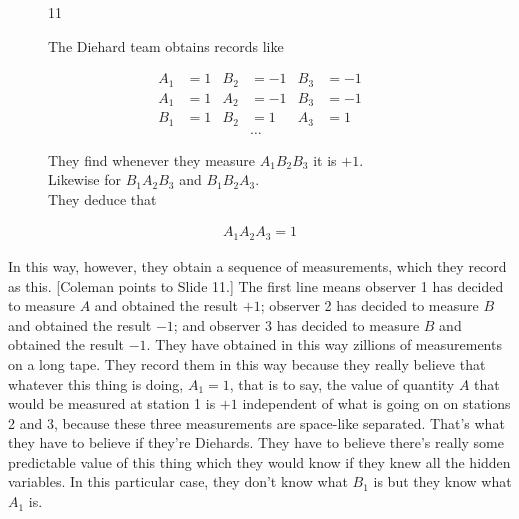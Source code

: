 \documentclass[12pt,nofootinbib]{revtex4}
\begin{document}
\begin{figure}[htb] 
\begin{mdframed}
  \vspace{5pt}\hfill 11\\ %
  \begin{raggedright}
    The Diehard team obtains records like
  \end{raggedright}
\begin{align}\nonumber
  &&  A_1&=1 &B_2&=-1 &B_3&=-1&&\\\nonumber
  &&  A_1&=1 &A_2&=-1 &B_3&=-1&&\\\nonumber
  &&  B_1&=1 &B_2&=1  &A_3&=1 &&\\\nonumber
   &&&&&          \ldots   &&&&
\end{align}

\begin{raggedright}
  They find whenever they measure
  $A_1B_2B_3$ it is $+1$.\\
  Likewise for $B_1A_2B_3$ and $B_1B_2A_3$.\\[\baselineskip]
  They deduce that\\[-1.2\baselineskip]
\end{raggedright}
\begin{align}\nonumber
  \boxed{A_1A_2A_3=1} %
\end{align}
\vspace{-.5\baselineskip}
\end{mdframed}
\end{figure}
In this way, however, they obtain a sequence of measurements, which they record as this. [Coleman points to Slide 11.] The first line means observer 1 has decided to measure $A$ and obtained the result $+1$; observer 2 has decided to measure $B$ and obtained the result $-1$; and observer 3 has decided to measure $B$ and obtained the result $-1$. They have obtained in this way zillions of measurements on a long tape. They record them in this way because they really believe that whatever this thing is doing, $A_1=1$, that is to say, the value of quantity $A$ that would be measured at station 1 is $+1$ independent of what is going on on stations 2 and 3, because these three measurements are space-like separated. That's what they have to believe if they're Diehards. They have to believe there's really some predictable value of this thing which they would know if they knew all the hidden variables. In this particular case, they don't know what $B_1$ is but they know what $A_1$ is.
\end{document}
